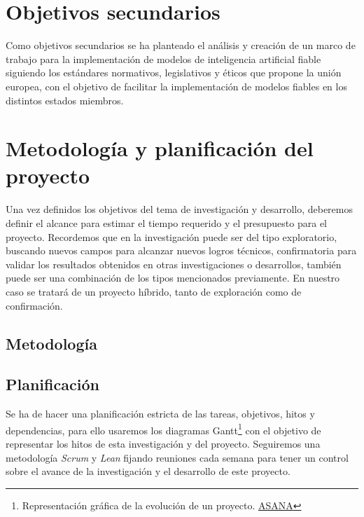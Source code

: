 
\section{Objetivos secundarios}
Como objetivos secundarios se ha planteado el análisis y creación de un marco de trabajo para la implementación de modelos de inteligencia artificial fiable siguiendo los estándares normativos, legislativos y éticos que propone la unión europea, con el objetivo de facilitar la implementación de modelos fiables en los distintos estados miembros.

\section{Metodología y planificación del proyecto}

Una vez definidos los objetivos del tema de investigación y desarrollo, deberemos definir el alcance para estimar el tiempo requerido y el presupuesto para el proyecto.
Recordemos que en la investigación puede ser del tipo exploratorio, buscando nuevos campos para alcanzar nuevos logros técnicos, confirmatoria para validar los resultados obtenidos en otras investigaciones o desarrollos, también puede ser una combinación de los tipos mencionados previamente.
En nuestro caso se tratará de un proyecto híbrido, tanto de exploración como de confirmación.


\subsection{Metodología}


\subsection{Planificación}

Se ha de hacer una planificación estricta de las tareas, objetivos, hitos y dependencias, para ello usaremos los diagramas Gantt\footnote{Representación gráfica de la evolución de un proyecto. \href{https://asana.com/es/resources/gantt-chart-basics}{ASANA}} con el objetivo de representar los hitos de esta investigación y del proyecto.
Seguiremos una metodología \textit{Scrum} y \textit{Lean} fijando reuniones cada semana para tener un control sobre el avance de la investigación y el desarrollo de este proyecto.

